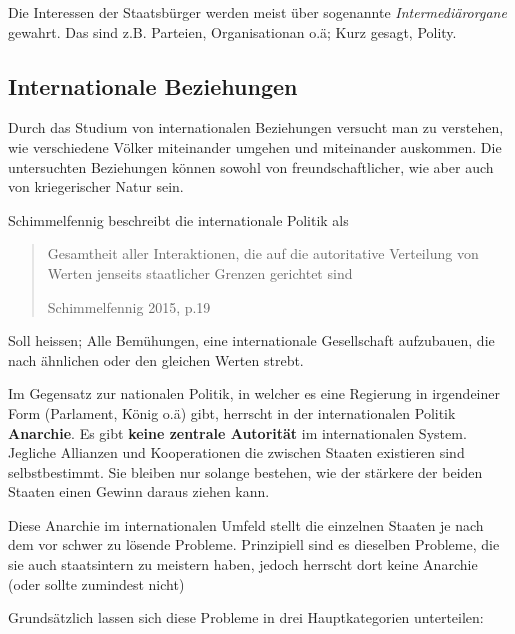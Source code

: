 \documentclass[a4paper, 11pt]{article}
\begin{document}
Die Interessen der Staatsbürger werden meist über sogenannte \textit{Intermediärorgane} gewahrt. Das sind z.B. Parteien, Organisationan o.ä; Kurz gesagt, Polity.

\newpage

\subsection{Internationale Beziehungen}

Durch das Studium von internationalen Beziehungen versucht man zu verstehen, wie verschiedene Völker miteinander umgehen und miteinander auskommen. Die untersuchten Beziehungen können sowohl von freundschaftlicher, wie aber auch von kriegerischer Natur sein.

\vspace{10px}

Schimmelfennig beschreibt die internationale Politik als \blockquote[Schimmelfennig 2015, p.19]{Gesamtheit aller Interaktionen, die auf die autoritative Verteilung von Werten jenseits staatlicher Grenzen gerichtet sind}. Soll heissen; Alle Bemühungen, eine internationale Gesellschaft aufzubauen, die nach ähnlichen oder den gleichen Werten strebt.

\vspace{10px}

Im Gegensatz zur nationalen Politik, in welcher es eine Regierung in irgendeiner Form (Parlament, König o.ä) gibt, herrscht in der internationalen Politik \textbf{Anarchie}. Es gibt \textbf{keine zentrale Autorität} im internationalen System. Jegliche Allianzen und Kooperationen die zwischen Staaten existieren sind selbstbestimmt. Sie bleiben nur solange bestehen, wie der stärkere der beiden Staaten einen Gewinn daraus ziehen kann.

Diese Anarchie im internationalen Umfeld stellt die einzelnen Staaten je nach dem vor schwer zu lösende Probleme. Prinzipiell sind es dieselben Probleme, die sie auch staatsintern zu meistern haben, jedoch herrscht dort keine Anarchie (oder sollte zumindest nicht)

Grundsätzlich lassen sich diese Probleme in drei Hauptkategorien unterteilen:
\end{document}
